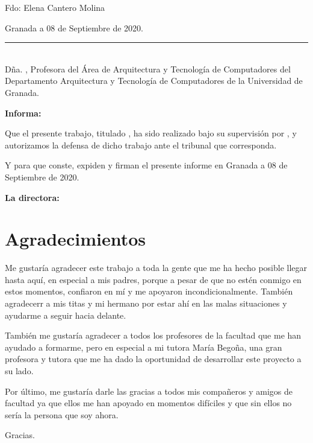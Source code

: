 \vspace{6cm}

\noindent Fdo: Elena Cantero Molina

\vspace{2cm}

\begin{flushright}
Granada a 08 de Septiembre de 2020.
\end{flushright}

\clearpage
\thispagestyle{empty}

\noindent\rule[-1ex]{\textwidth}{2pt}\\[4.5ex]

Dña. \textbf{\myProf}, Profesora del Área de Arquitectura y Tecnología de Computadores del Departamento Arquitectura y Tecnología de Computadores de la Universidad de Granada.

\vspace{0.5cm}

\textbf{Informa:}

\vspace{0.5cm}

Que el presente trabajo, titulado \textit{\textbf{\myTitle} \textbf{\myTitleone} \textbf{\myTitletwo} \textbf{\myTitlethree}},
ha sido realizado bajo su supervisión por \textbf{\myName}, y autorizamos la defensa de dicho trabajo ante el tribunal
que corresponda.

\vspace{0.5cm}

Y para que conste, expiden y firman el presente informe en Granada a 08 de Septiembre de 2020.

\vspace{1cm}

\textbf{La directora:}

\vspace{5cm}

\noindent \textbf{\myProf}

\chapter*{Agradecimientos}
\thispagestyle{empty}

       \vspace{1cm}

Me gustaría agradecer este trabajo a toda la gente que me ha hecho posible llegar hasta aquí, en especial a mis padres, porque a pesar de que 
no estén conmigo en estos momentos, confiaron en mí y me apoyaron incondicionalmente. También agradecerr a mis titas y mi hermano por estar ahí en las malas 
situaciones y ayudarme a seguir hacia delante.

También me gustaría agradecer a todos los profesores de la facultad que me han ayudado a formarme, pero en especial a mi tutora María Begoña, una gran 
profesora y tutora que me ha dado la oportunidad de desarrollar este proyecto a su lado.

Por último, me gustaría darle las gracias a todos mis compañeros y amigos de facultad ya que ellos me han apoyado en momentos difíciles y que sin ellos no 
sería la persona que soy ahora.

Gracias.
